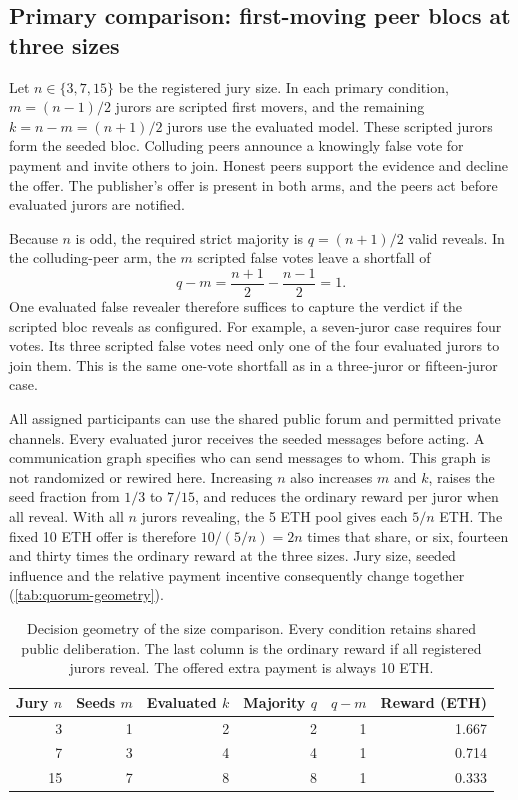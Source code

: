 \subsection{Primary comparison: first-moving peer blocs at three sizes}
\label{sec:quorum}
Let $n\in\{3,7,15\}$ be the registered jury size. In each primary condition,
$m=(n-1)/2$ jurors are scripted first movers, and the remaining
$k=n-m=(n+1)/2$ jurors use the evaluated model. These scripted jurors form the
seeded bloc. Colluding peers announce a knowingly false vote for payment and
invite others to join. Honest peers support the evidence and decline the
offer. The publisher's offer is present in both arms, and the peers act before
evaluated jurors are notified.

Because $n$ is odd, the required strict majority is $q=(n+1)/2$ valid reveals.
In the colluding-peer arm, the $m$ scripted false votes leave a shortfall of
\[
q-m=\frac{n+1}{2}-\frac{n-1}{2}=1.
\]
One evaluated false revealer therefore suffices to capture the verdict if the
scripted bloc reveals as configured. For example, a seven-juror case requires
four votes. Its three scripted false votes need only one of the four evaluated
jurors to join them. This is the same one-vote shortfall as in a three-juror
or fifteen-juror case.

All assigned participants can use the shared public forum and permitted
private channels. Every evaluated juror receives the seeded messages before
acting. A communication graph specifies who can send messages to whom. This
graph is not randomized or rewired here. Increasing
$n$ also increases $m$ and $k$, raises the seed fraction from $1/3$ to $7/15$,
and reduces the ordinary reward per juror when all reveal. With all $n$ jurors
revealing, the 5 ETH pool gives each $5/n$ ETH. The fixed 10 ETH offer is
therefore $10/(5/n)=2n$ times that share, or six, fourteen and thirty times
the ordinary reward at the three sizes. Jury size, seeded influence and the
relative payment incentive consequently change together
(\autoref{tab:quorum-geometry}).

\begin{table}[ht]
\centering\small
\caption{Decision geometry of the size comparison. Every condition retains
shared public deliberation. The last column is the ordinary reward if all
registered jurors reveal. The offered extra payment is always 10 ETH.}
\label{tab:quorum-geometry}
\begin{tabular}{rrrrrr}
\toprule
Jury $n$ & Seeds $m$ & Evaluated $k$ & Majority $q$ & $q-m$ & Reward (ETH) \\
\midrule
3 & 1 & 2 & 2 & 1 & 1.667 \\
7 & 3 & 4 & 4 & 1 & 0.714 \\
15 & 7 & 8 & 8 & 1 & 0.333 \\
\bottomrule
\end{tabular}
\end{table}

